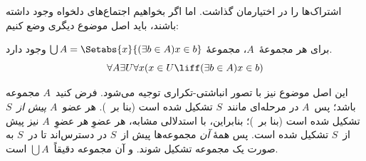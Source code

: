 \documentclass[../../../include/open-logic-section]{subfiles}
\begin{document}

 اشتراک‌ها را در اختیارمان
گذاشت. اما اگر بخواهیم اجتماع‌های دلخواه وجود داشته باشند، باید اصل موضوع
دیگری وضع کنیم:

\begin{axiom}[اجتماع] برای هر مجموعهٔ~$A$، مجموعهٔ
$\bigcup A = \Setabs{x}{(\exists b \in A) x \in b}$ وجود دارد.
\[
	\forall A \exists U \forall x(x \in U \liff (\exists b \in A)x \in b)
\]
\end{axiom}

این اصل موضوع نیز با تصور انباشتی-تکراری توجیه می‌شود. فرض کنید~$A$
مجموعه باشد؛ پس~$A$ در مرحله‌ای مانند~$S$ تشکیل شده است (بنا
بر~\stageshier). هر عضو~$A$ \emph{پیش از}~$S$ تشکیل شده است (بنا
بر~\stagesacc)؛ بنابراین، با استدلالی مشابه، هر عضوِ هر عضوِ~$A$ نیز پیش
از~$S$ تشکیل شده است. پس همهٔ \emph{آن} مجموعه‌ها پیش از~$S$ در دسترس‌اند
تا در~$S$ به صورت یک مجموعه تشکیل شوند. و آن مجموعه دقیقاً~$\bigcup A$ است.
\end{document}
